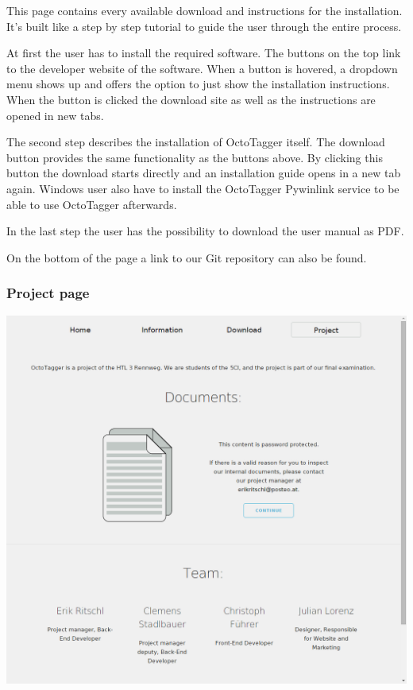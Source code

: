This page contains every available download and instructions for the installation. It's built like a step by step tutorial to guide the user through the entire process.

At first the user has to install the required software. The buttons on the top link to the developer website of the software. When a button is hovered, a dropdown menu shows up and offers the option to just show the installation instructions. When the button is clicked the download site as well as the instructions are opened in new tabs.
 
The second step describes the installation of OctoTagger itself. The download button provides the same functionality as the buttons above. By clicking this button the download starts directly and an installation guide opens in a new tab again. Windows user also have to install the OctoTagger Pywinlink service to be able to use OctoTagger afterwards.

In the last step the user has the possibility to download the user manual as PDF.

On the bottom of the page a link to our Git repository can also be found.

\subsubsection{Project page}

\begin{center}
\includegraphics[scale=0.35]{images/project_full.png}
\end{center}

